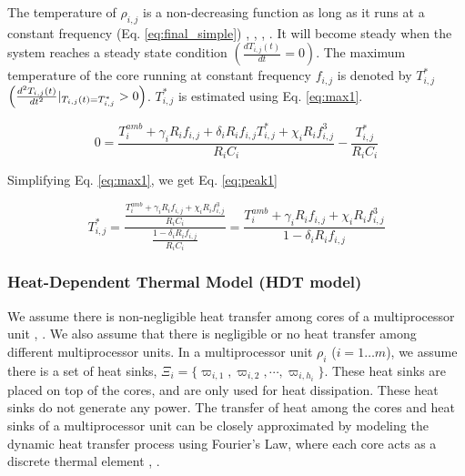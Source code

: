 \documentclass[conference]{IEEEtran}
\begin{document}
The temperature of $\rho_{i,j}$  is a non-decreasing function as long as it runs at a constant frequency (Eq. \ref{eq:final_simple})
\cite{Chantem10}, \cite{Quan10}, \cite{Fisher09},  \cite{Chaturvedi10}.
It will become steady when the system reaches a steady state condition $\left(\frac{dT_{i,j}(t)}{dt}=0\right)$.  The maximum temperature of the
core running at constant frequency $f_{i,j}$ is denoted by $T^*_{i,j}$ $ \left(\frac{d^2T_{i,j}(t)}{dt^2} \arrowvert_{T_{i,j}(t)=T^*_{i,j}} >0\right)$.  
$T^*_{i,j}$ is estimated using Eq. \ref{eq:max1}.

\vspace{-0.1in}

\begin{equation}\label{eq:max1}
			0 =  \frac{ T_i^{amb} + \gamma_i  R_i f_{i,j} + \delta_i  R_i f_{i,j} T^*_{i,j} + \chi_i  R_i f_{i,j}^3 } { R_iC_i} - \frac{T^*_{i,j}}{R_iC_i}  
\end{equation}

\vspace{-0.1in}

Simplifying Eq. \ref{eq:max1}, we get Eq. \ref{eq:peak1}

\vspace{-0.1in}

\begin{equation}\label{eq:peak1}
T^*_{i,j} = \frac{ \frac{T_i^{amb} + \gamma_i R_i f_{i,j} + \chi_i R_i f_{i,j}^3}{R_iC_i} }{ \frac{1 - \delta_iR_i f_{i,j}}{R_iC_i} } = 
\frac{T_i^{amb} + \gamma_i R_if_{i,j} + \chi_i R_if_{i,j}^3}{1-\delta_i R_if_{i,j}}
\end{equation}
\vspace{-0.2in}


\subsubsection{Heat-Dependent Thermal Model (HDT model)}
\label{sec:complex}

We assume there is non-negligible heat transfer among cores of a multiprocessor unit \cite{Chantem10}, \cite{Fisher09}.
We also assume that there is negligible or no heat transfer among different multiprocessor units.
In a multiprocessor unit $\rho_i$ ($i=1\ldots m$), we assume there is a set of heat sinks, $\Xi_i = \{\varpi_{i,1}, \varpi_{i,2},\cdots, \varpi_{i,h_i}\}$.
These heat sinks are placed on top of the cores, and are only used for heat dissipation. These heat sinks do not generate any power.
The transfer of heat among the cores and heat sinks of a multiprocessor unit can be closely approximated by modeling 
the dynamic heat transfer process
using Fourier's Law, where
each core acts as a discrete thermal element  \cite{Chantem10}, \cite{Fisher09}. 
\end{document}

